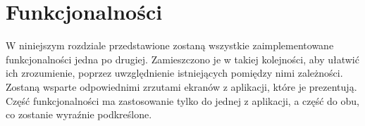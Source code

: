 \chapter{Funkcjonalności}

W niniejszym rozdziale przedstawione zostaną wszystkie zaimplementowane funkcjonalności jedna po drugiej. Zamieszczono je w takiej kolejności, aby ułatwić ich zrozumienie, poprzez uwzględnienie istniejących pomiędzy nimi zależności. Zostaną wsparte odpowiednimi zrzutami ekranów z aplikacji, które je prezentują. Część funkcjonalności ma zastosowanie tylko do jednej z aplikacji, a część do obu, co zostanie wyraźnie podkreślone.

















% 

